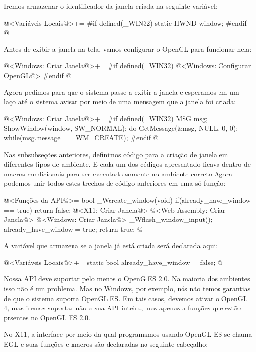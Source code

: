 Iremos armazenar o identificador da janela criada na seguinte
variável:

\iniciocodigo
@<Variáveis Locais@>+=
#if defined(_WIN32)
static HWND window;
#endif
@
\fimcodigo

Antes de exibir a janela na tela, vamos configurar o OpenGL para
funcionar nela:

\iniciocodigo
@<Windows: Criar Janela@>+=
#if defined(_WIN32)
@<Windows: Configurar OpenGL@>
#endif
@
\fimcodigo

Agora pedimos para que o sistema passe a exibir a janela e esperamos
em um laço até o sistema avisar por meio de uma mensagem que a janela
foi criada:

\iniciocodigo
@<Windows: Criar Janela@>+=
#if defined(_WIN32)
{
  MSG msg;
  ShowWindow(window, SW_NORMAL);
  do{
    GetMessage(&msg, NULL, 0, 0);
  } while(msg.message == WM_CREATE);
}
#endif
@
\fimcodigo


Nas subsubseções anteriores, definimos código para a criação de janela
em diferentes tipos de ambiente. E cada um dos códigos apresentado
ficava dentro de macros condicionais para ser executado somente no
ambiente correto.Agora podemos unir todos estes trechos de código
anteriores em uma só função:

\iniciocodigo
@<Funções da API@>=
bool _Wcreate_window(void){
  if(already_have_window == true)
    return false;
  @<X11: Criar Janela@>
  @<Web Assembly: Criar Janela@>
  @<Windows: Criar Janela@>
  _Wflush_window_input();
  already_have_window = true;
  return true;
}
@
\fimcodigo

A variável que armazena se a janela já está criada será declarada
aqui:

\iniciocodigo
@<Variáveis Locais@>+=
static bool already_have_window = false;
@
\fimcodigo


Nossa API deve suportar pelo menos o OpenG ES 2.0. Na maioria dos
ambientes isso não é um problema. Mas no Windows, por exemplo, nós não
temos garantias de que o sistema suporta OpenGL ES. Em tais casos,
devemos ativar o OpenGL 4, mas iremos suportar não a sua API inteira,
mas apenas a funções que estão prsentes no OpenGL ES 2.0.


No X11, a interface por meio da qual programamos usando OpenGL ES se
chama EGL e suas funções e macros são declaradas no seguinte
cabeçalho:

